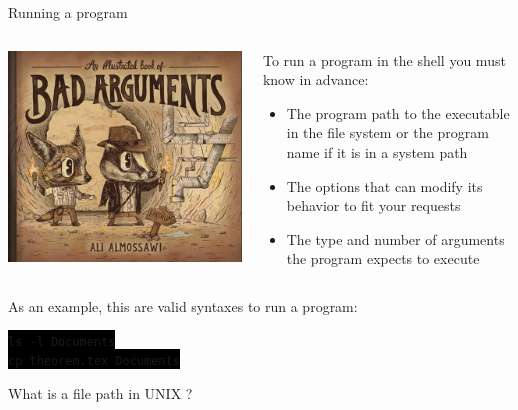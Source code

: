 \documentclass[unknownkeysallowed, 10pt, a4 paper, handout]{beamer}
\newcommand{\code}[1]{\colorbox{black}{\color{green}\texttt{#1}}}
\begin{document}
\begin{frame}[label=running]{Running a program}
  \begin{columns}[T]
    \begin{column}{.33\textwidth}
      \includegraphics[scale=0.99]{pics/bad_arguments.jpg}
    \end{column}
    \hfill
    \begin{column}{.63\textwidth}
      \small{
      To run a program in the shell you must know in advance:
      \begin{itemize}
        \item The program path to the executable in the file system or the
          program name if it is in a system path
        \item The options that can modify its behavior to fit your requests
        \item The type and number of arguments the program expects to
          execute
      \end{itemize}
    }
    \end{column}
  \end{columns}
  As an example, this are valid syntaxes to run a program:
  \begin{center}
  \code{ls -l Documents} \\
  \code{cp theorem.tex Documents}
  \end{center}
  \begin{center}
    \Large{What is a file path in UNIX ?}
  \end{center}
\end{frame}
\end{document}
